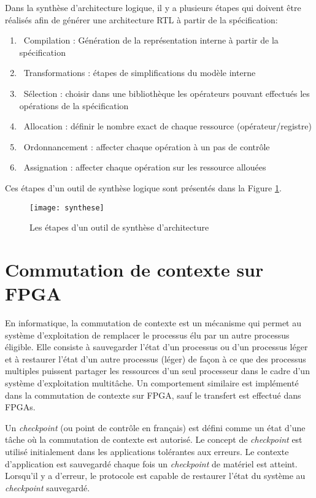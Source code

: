 Dans la synthèse d'architecture logique, il y a plusieurs étapes qui doivent être réalisés afin de générer 
une architecture RTL à partir de la spécification:
\begin{enumerate}
	\item\ Compilation : Génération de la représentation interne à partir de la spécification
	\item\ Transformations : étapes de simplifications du modèle interne
	\item\ Sélection : choisir dans une bibliothèque les opérateurs pouvant effectués les opérations de la spécification
	\item\ Allocation : définir le nombre exact de chaque ressource (opérateur/registre)
	\item\ Ordonnancement : affecter chaque opération à un pas de contrôle
	\item\ Assignation : affecter chaque opération sur les ressource allouées
\end{enumerate}
Ces étapes d'un outil de synthèse logique sont présentés dans la Figure \ref{fig:synthese}.

\begin{figure}[h]
	\centering
	\texttt{[image: synthese]}
	\caption{Les étapes d'un outil de synthèse d'architecture}
	\label{fig:synthese}
	\vspace{-2mm}
\end{figure}

\section{Commutation de contexte sur FPGA}
\label{sec:contextswitch}

En informatique, la commutation de contexte est un mécanisme qui permet au système d'exploitation 
de remplacer le processus élu par un autre processus éligible. Elle consiste à sauvegarder l'état d'un processus
ou d'un processus léger et à restaurer l'état d'un autre processus (léger) de façon à ce que des processus
multiples puissent partager les ressources d'un seul processeur dans le cadre d'un système d'exploitation
multitâche\cite{technonet}. 
Un comportement similaire est implémenté dans la commutation de contexte sur FPGA, sauf le transfert
est effectué dans FPGAs.

Un \emph{checkpoint} (ou point de contrôle en français) est défini comme un état d'une tâche où la commutation de contexte est 
autorisé\cite{Bourge2015}. Le concept de \emph{checkpoint} est utilisé initialement dans les applications tolérantes aux erreurs. Le contexte
d'application est sauvegardé chaque fois un \emph{checkpoint} de matériel est atteint. Lorsqu'il y a d'erreur, le protocole est capable de restaurer
l'état du système au \emph{checkpoint} sauvegardé.

